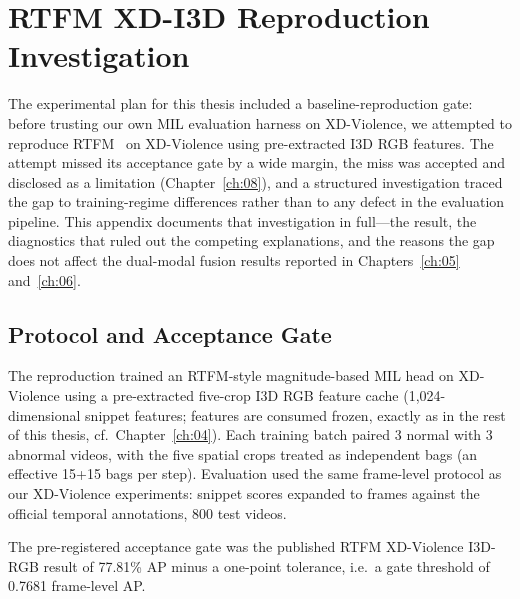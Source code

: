 \chapter{RTFM XD-I3D Reproduction Investigation}
\label{app:a}

The experimental plan for this thesis included a baseline-reproduction gate:
before trusting our own MIL evaluation harness on XD-Violence, we attempted
to reproduce RTFM~\cite{tian2021rtfm} on XD-Violence using pre-extracted I3D
RGB features. The attempt missed its acceptance gate by a wide margin, the
miss was accepted and disclosed as a limitation
(Chapter~\ref{ch:08}), and a structured investigation traced the gap to
training-regime differences rather than to any defect in the evaluation
pipeline. This appendix documents that investigation in full---the result,
the diagnostics that ruled out the competing explanations, and the reasons
the gap does not affect the dual-modal fusion results reported in
Chapters~\ref{ch:05} and~\ref{ch:06}.

\section{Protocol and Acceptance Gate}
\label{sec:appa-protocol}

The reproduction trained an RTFM-style magnitude-based MIL head on
XD-Violence using a pre-extracted five-crop I3D RGB feature cache
(1{,}024-dimensional snippet features; features are consumed frozen, exactly
as in the rest of this thesis, cf.\ Chapter~\ref{ch:04}). Each training batch
paired 3 normal with 3 abnormal videos, with the five spatial crops treated
as independent bags (an effective 15+15 bags per step). Evaluation used the
same frame-level protocol as our XD-Violence experiments: snippet scores
expanded to frames against the official temporal annotations, 800 test
videos.

The pre-registered acceptance gate was the published RTFM XD-Violence
I3D-RGB result of 77.81\% AP minus a one-point tolerance, i.e.\ a gate
threshold of 0.7681 frame-level AP.

